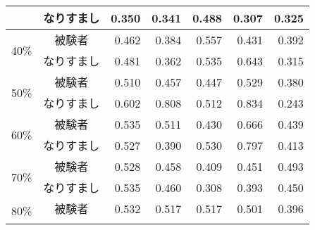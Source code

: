 \begin{center}
\begin{longtable}[btph]{|c|c|r|r|r|r|r|}
           & なりすまし & 0.350 & 0.341 & 0.488 & 0.307 & 0.325 \\ \hline
      \multirow{2}{*}{40\%} & 被験者 & 0.462 & 0.384 & 0.557 & 0.431 & 0.392 \\ \cline{2-7}
           & なりすまし & 0.481 & 0.362 & 0.535 & 0.643 & 0.315 \\ \hline
      \multirow{2}{*}{50\%} & 被験者 & 0.510 & 0.457 & 0.447 & 0.529 & 0.380 \\ \cline{2-7}
           & なりすまし & 0.602 & 0.808 & 0.512 & 0.834 & 0.243 \\ \hline
      \multirow{2}{*}{60\%} & 被験者 & 0.535 & 0.511 & 0.430 & 0.666 & 0.439 \\ \cline{2-7}
           & なりすまし & 0.527 & 0.390 & 0.530 & 0.797 & 0.413 \\ \hline
      \multirow{2}{*}{70\%} & 被験者 & 0.528 & 0.458 & 0.409 & 0.451 & 0.493 \\ \cline{2-7}
           & なりすまし & 0.535 & 0.460 & 0.308 & 0.393 & 0.450 \\ \hline
      \multirow{2}{*}{80\%} & 被験者 & 0.532 & 0.517 & 0.517 & 0.501 & 0.396 \\ \cline{2-7}

\end{longtable}
\end{center}
